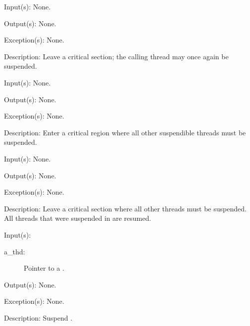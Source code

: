 \begin{capi}
\label{thd_crit_leave}
	\begin{capilist}
	\item[Input(s): ] None.
	\item[Output(s): ] None.
	\item[Exception(s): ] None.
	\item[Description: ]
		Leave a critical section; the calling thread may once again be
		suspended.
	\end{capilist}
\label{thd_single_enter}
	\begin{capilist}
	\item[Input(s): ] None.
	\item[Output(s): ] None.
	\item[Exception(s): ] None.
	\item[Description: ]
		Enter a critical region where all other suspendible threads must
		be suspended.
	\end{capilist}
\label{thd_single_leave}
	\begin{capilist}
	\item[Input(s): ] None.
	\item[Output(s): ] None.
	\item[Exception(s): ] None.
	\item[Description: ]
		Leave a critical section where all other threads must be
		suspended.  All threads that were suspended in
		 are resumed.
	\end{capilist}
\label{thd_suspend}
	\begin{capilist}
	\item[Input(s): ]
		\begin{description}\item[]
		\item[a\_thd: ]
			Pointer to a \classname{thd}.
		\end{description}
	\item[Output(s): ] None.
	\item[Exception(s): ] None.
	\item[Description: ]
		Suspend \cvar{a\_thd}.
	\end{capilist}
\label{thd_trysuspend}

\end{capi}
